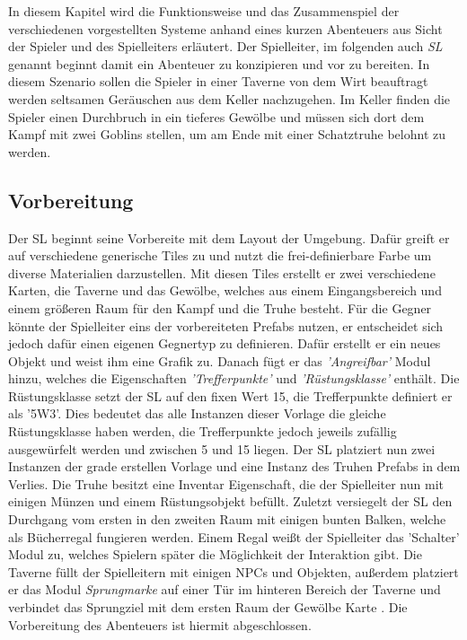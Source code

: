 In diesem Kapitel wird die Funktionsweise und das Zusammenspiel der verschiedenen vorgestellten Systeme anhand eines kurzen Abenteuers aus Sicht der Spieler und des Spielleiters erläutert.\newline
Der Spielleiter, im folgenden auch \emph{SL} genannt beginnt damit ein Abenteuer zu konzipieren und vor zu bereiten. In diesem Szenario sollen die Spieler in einer Taverne von dem Wirt beauftragt werden seltsamen Geräuschen aus dem Keller nachzugehen. Im Keller finden die Spieler einen Durchbruch in ein tieferes Gewölbe und müssen sich dort dem Kampf mit zwei Goblins stellen, um am Ende mit einer Schatztruhe belohnt zu werden.\newline
\subsection{Vorbereitung}
\label{sec:Vorbereitung}
Der SL beginnt seine Vorbereite mit dem Layout der Umgebung. Dafür greift er auf verschiedene generische Tiles zu und nutzt die frei-definierbare Farbe um diverse Materialien darzustellen. Mit diesen Tiles erstellt er zwei verschiedene Karten, die Taverne und das Gewölbe, welches aus einem Eingangsbereich und einem größeren Raum für den Kampf und die Truhe besteht. Für die Gegner könnte der Spielleiter eins der vorbereiteten Prefabs nutzen, er entscheidet sich jedoch dafür einen eigenen Gegnertyp zu definieren. Dafür erstellt er ein neues Objekt und weist ihm eine Grafik zu. Danach fügt er das \emph{'Angreifbar'} Modul hinzu, welches die Eigenschaften \emph{'Trefferpunkte'} und \emph{'Rüstungsklasse'} enthält. Die Rüstungsklasse setzt der SL auf den fixen Wert 15, die Trefferpunkte definiert er als '5W3'. Dies bedeutet das alle Instanzen dieser Vorlage die gleiche Rüstungsklasse haben werden, die Trefferpunkte jedoch jeweils zufällig ausgewürfelt werden und zwischen 5 und 15 liegen.\newline
Der SL platziert nun zwei Instanzen der grade erstellen Vorlage und eine Instanz des Truhen Prefabs in dem Verlies. Die Truhe besitzt eine Inventar Eigenschaft, die der Spielleiter nun mit einigen Münzen und einem Rüstungsobjekt befüllt. Zuletzt versiegelt der SL den Durchgang vom ersten in den zweiten Raum mit einigen bunten Balken, welche als Bücherregal fungieren werden. Einem Regal weißt der Spielleiter das 'Schalter' Modul zu, welches Spielern später die Möglichkeit der Interaktion gibt.\newline
Die Taverne füllt der Spielleitern mit einigen NPCs und Objekten, außerdem platziert er das Modul \emph{Sprungmarke} auf einer Tür im hinteren Bereich der Taverne und verbindet das Sprungziel mit dem ersten Raum der Gewölbe Karte . \newline
Die Vorbereitung des Abenteuers ist hiermit abgeschlossen.

